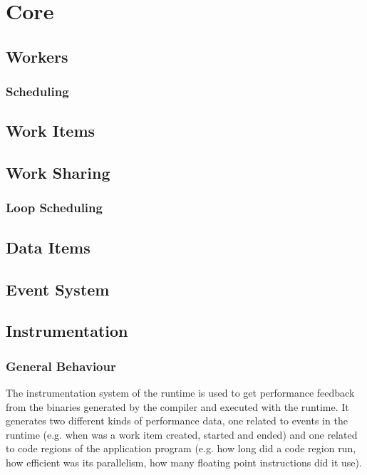 \section{Core}
\subsection{Workers}
\subsubsection{Scheduling}
\subsection{Work Items}
\subsection{Work Sharing}
\subsubsection{Loop Scheduling}
\subsection{Data Items}
\subsection{Event System}

\subsection{Instrumentation}
\label{sec:runtime.instrumentation}

\subsubsection{General Behaviour}
\label{sec:runtime.instrumentation.general.behaviour}

The instrumentation system of the runtime is used to get performance feedback
from the binaries generated by the compiler and executed with the runtime. It
generates two different kinds of performance data, one related to events in the
runtime (e.g. when was a work item created, started and ended) and one related
to code regions of the application program (e.g. how long did a code region run,
how efficient was its parallelism, how many floating point instructions did it
use).

